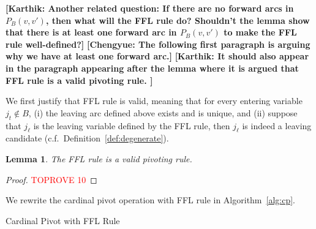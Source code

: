 \documentclass[11pt]{article}
\newcommand{\knote}[1]{{\bf{\color{blue}[\tiny Karthik: #1]}}}
\newcommand{\cnote}[1]{{\bf{\color{red}[\tiny Chengyue: #1]}}}
\newtheorem{lemma}[theorem]{Lemma}
\begin{document}
\knote{Another related question: If there are no forward arcs in $P_B(v, v')$, then what will the FFL rule do? Shouldn't the lemma show that there is at least one forward arc in $P_B(v, v')$ to make the FFL rule well-defined?} \cnote{The following first paragraph is arguing why we have at least one forward arc.}
\knote{It should also appear in the paragraph appearing after the lemma where it is argued that FFL rule is a valid pivoting rule. }
\fi

We first justify that FFL rule is valid, meaning that for every entering variable $j_t\notin B$, (i) the leaving arc defined above exists and is unique, and (ii) suppose that $j_\ell$ is the leaving variable defined by the FFL rule, then $j_\ell$ is indeed a leaving candidate (c.f.~Definition~\ref{def:degenerate}).

\begin{lemma}\label{lem:FFL-well-defined}
    The FFL rule is a valid pivoting rule.
\end{lemma}
\begin{proof}\textcolor{red}{TOPROVE 10}\end{proof}
We rewrite the cardinal pivot operation with FFL rule in Algorithm~\ref{alg:cp}.
\begin{algorithm}
\caption{Cardinal Pivot with FFL Rule}\label{alg:cp}
\begin{algorithmic}
\Else 
{}
\EndIf
{}
\end{algorithmic}
\end{algorithm}
\end{document}
